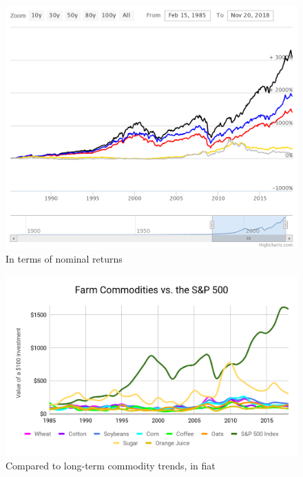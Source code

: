 \documentclass{article}
\begin{document}
\vspace{10pt}

\begin{figure}[!htb]
    \centering
    \includegraphics[width=450pt]{imgs/17.png}
    \caption{In terms of nominal returns}
\end{figure}

\vspace{10pt}

\begin{figure}[!htb]
    \centering
    \includegraphics[width=\textwidth]{imgs/18.png}
    \caption{Compared to long-term commodity trends, in fiat}
\end{figure}

\vspace{10pt}
\end{document}
